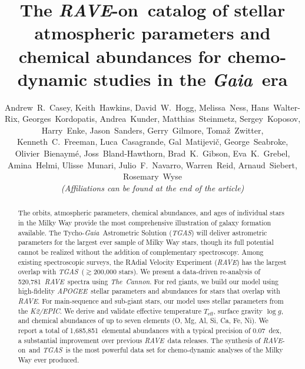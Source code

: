 \documentclass[preprint]{aastex}
\newcommand{\acronym}[1]{{\small{#1}}}
\newcommand{\project}[1]{\textsl{#1}}
\newcommand{\gaia}{\project{Gaia}}
\newcommand{\thecannon}{\project{The~Cannon}}
\newcommand{\rave}{\project{\acronym{RAVE}}}
\newcommand{\apogee}{\project{\acronym{APOGEE}}}
\newcommand{\epic}{\project{K2/EPIC}}
\newcommand{\tgas}{\project{\acronym{TGAS}}}
\newcommand{\raveon}{\rave-on}
\newcommand{\teff}{T_{\mathrm{eff}}}
\newcommand{\logg}{\log g}
\newcommand{\Nspectra}{520,781}
\newcommand{\ReportedAbundances}{1,685,851} %
\begin{document}
\title{The \raveon\ catalog of stellar atmospheric parameters and\\
chemical abundances for chemo-dynamic studies in the \gaia\ era}

\author{
Andrew~R.~Casey,
Keith~Hawkins,
David~W.~Hogg,
Melissa~Ness,
Hans~Walter-Rix,
Georges~Kordopatis,
Andrea~Kunder,
Matthias~Steinmetz,
Sergey~Koposov,
Harry~Enke,
Jason~Sanders,
Gerry~Gilmore,
Toma\v{z}~Zwitter,
Kenneth~C.~Freeman,
Luca~Casagrande,
Gal~Matijevi\v{c},
George~Seabroke,
Olivier~Bienaym\'e,
Joss~Bland-Hawthorn,
Brad~K.~Gibson,
Eva~K.~Grebel,
Amina~Helmi,
Ulisse~Munari,
Julio~F.~Navarro,
Warren~Reid,
Arnaud~Siebert,
Rosemary~Wyse\\
\vspace{2em}
\emph{(Affiliations can be found at the end of the article)}
}


\begin{abstract}
The orbits, atmospheric parameters, chemical abundances, and ages of 
individual stars in the Milky Way provide the most comprehensive 
illustration of galaxy formation available.  The Tycho-\gaia\ 
Astrometric Solution (\tgas) will deliver astrometric parameters for
the largest ever sample of Milky Way stars, though its full potential
cannot be realized without the addition of complementary spectroscopy.  
Among existing spectroscopic surveys, the RAdial Velocity Experiment 
(\rave) has the largest overlap with \tgas\ ($\gtrsim$200,000 stars).  
We present a data-driven re-analysis of \Nspectra\ \rave\ spectra using 
\thecannon.  For red giants, we build our model using high-fidelity 
\apogee\ stellar parameters and abundances for stars that overlap 
with \rave.  For main-sequence and sub-giant stars, our model uses 
stellar parameters from the \epic.  We derive and validate 
effective temperature $\teff$, surface gravity $\logg$, and chemical 
abundances of up to seven elements (O, Mg, Al, Si, Ca, Fe, Ni).  We 
report a total of \ReportedAbundances\ elemental abundances with a 
typical precision of 0.07~dex, a substantial improvement over previous 
\rave\ data releases.  The synthesis of \raveon\ and \tgas\ is the 
most powerful data set for chemo-dynamic analyses of the Milky Way 
ever produced.
\end{abstract}
\end{document}

